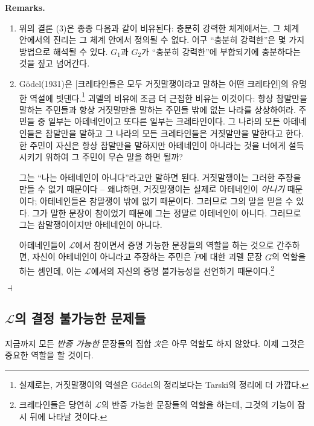\documentclass[12pt]{paper}
\newenvironment{context}[1][]{\noindent \textbf{{#1}.}}{\hfill $ \dashv $}
\begin{document}
  \begin{context}[Remarks]
    \begin{enumerate}
      \item 위의 결론 (3)은 종종 다음과 같이 비유된다:
      충분히 강력한 체계에서는, 그 체계 안에서의 진리는 그 체계 안에서 정의될 수 없다.
      어구 ``충분히 강력한''은 몇 가지 방법으로 해석될 수 있다.
      $G_1$과 $G_2$가 ``충분히 강력한''에 부합되기에 충분하다는 것을 짚고 넘어간다.

      \item G\"odel(1931)은 [크레타인들은 모두 거짓말쟁이라고 말하는 어떤 크레타인]의 유명한 역설에 빗댄다.\footnote
      {
        실제로는, 거짓말쟁이의 역설은 G\"odel의 정리보다는 Tarski의 정리에 더 가깝다.
      }
      괴델의 비유에 조금 더 근접한 비유는 이것이다:
      항상 참말만을 말하는 주민들과 항상 거짓말만을 말하는 주민들 밖에 없는 나라를 상상하여라.
      주민들 중 일부는 아테네인이고 또다른 일부는 크레타인이다.
      그 나라의 모든 아테네인들은 참말만을 말하고 그 나라의 모든 크레타인들은 거짓말만을 말한다고 한다.
      한 주민이 자신은 항상 참말만을 말하지만 아테네인이 아니라는 것을 너에게 설득시키기 위하여 그 주민이 무슨 말을 하면 될까?

      그는 ``나는 아테네인이 아니다''라고만 말하면 된다.
      거짓말쟁이는 그러한 주장을 만들 수 없기 때문이다 --
      왜냐하면, 거짓말쟁이는 실제로 아테네인이 \textit{아니기} 때문이다;
      아테네인들은 참말쟁이 밖에 없기 때문이다.
      그러므로 그의 말을 믿을 수 있다.
      그가 말한 문장이 참이었기 때문에 그는 정말로 아테네인이 아니다.
      그러므로 그는 참말쟁이이지만 아테네인이 아니다.

      아테네인들이 $\mathcal{L}$에서 참이면서 증명 가능한 문장들의 역할을 하는 것으로 간주하면,
      자신이 아테네인이 아니라고 주장하는 주민은 $\tilde{P}$에 대한 괴델 문장 $G$의 역할을 하는 셈인데,
      이는 $\mathcal{L}$에서의 자신의 증명 불가능성을 선언하기 때문이다.\footnote
      {
        크레타인들은 당연히 $\mathcal{L}$의 반증 가능한 문장들의 역할을 하는데,
        그것의 기능이 잠시 뒤에 나타날 것이다.
      }
    \end{enumerate}
  \end{context}

  \subsection{$\mathcal{L}$의 결정 불가능한 문제들}
  \hspace{12pt}

  지금까지 모든 \textit{반증 가능한} 문장들의 집합 $\mathcal{R}$은 아무 역할도 하지 않았다.
  이제 그것은 중요한 역할을 할 것이다.
\end{document}
